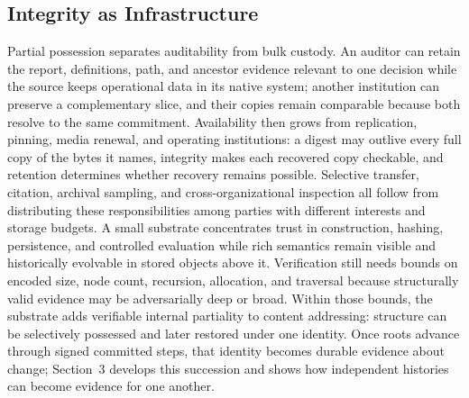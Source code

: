 





\subsection{Integrity as Infrastructure}

Partial possession separates auditability from bulk custody. An auditor can retain the report, definitions, path, and ancestor evidence relevant to one decision while the source keeps operational data in its native system; another institution can preserve a complementary slice, and their copies remain comparable because both resolve to the same commitment. Availability then grows from replication, pinning, media renewal, and operating institutions: a digest may outlive every full copy of the bytes it names, integrity makes each recovered copy checkable, and retention determines whether recovery remains possible. Selective transfer, citation, archival sampling, and cross-organizational inspection all follow from distributing these responsibilities among parties with different interests and storage budgets. A small substrate concentrates trust in construction, hashing, persistence, and controlled evaluation while rich semantics remain visible and historically evolvable in stored objects above it. Verification still needs bounds on encoded size, node count, recursion, allocation, and traversal because structurally valid evidence may be adversarially deep or broad. Within those bounds, the substrate adds verifiable internal partiality to content addressing: structure can be selectively possessed and later restored under one identity. Once roots advance through signed committed steps, that identity becomes durable evidence about change; Section~3 develops this succession and shows how independent histories can become evidence for one another.